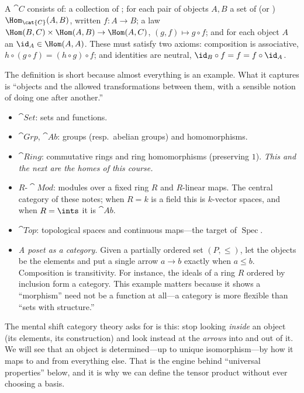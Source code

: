 \documentclass[11pt]{article}
\DeclareMathOperator{\Spec}{Spec}
\begin{document}
\begin{ddefinition}[Category]
A  $\cat{C}$ consists of: a collection of ; for each pair of
objects $A,B$ a set of  (or ) $\Hom_{\cat{C}}(A,B)$, written
$f\colon A\to B$; a  law $\Hom(B,C)\times\Hom(A,B)\to\Hom(A,C)$,
$(g,f)\mapsto g\circ f$; and for each object $A$ an  $\id_A\in\Hom(A,A)$.
These must satisfy two axioms: composition is associative, $h\circ(g\circ f)=(h\circ g)\circ
f$; and identities are neutral, $\id_B\circ f = f = f\circ\id_A$.
\end{ddefinition}

The definition is short because almost everything is an example. What it captures is
``objects and the allowed transformations between them, with a sensible notion of doing one
after another.''

\begin{eexample}
\begin{itemize}\setlength{\itemsep}{2pt}
\item $\cat{Set}$: sets and functions.
\item $\cat{Grp}$, $\cat{Ab}$: groups (resp.\ abelian groups) and homomorphisms.
\item $\cat{Ring}$: commutative rings and ring homomorphisms (preserving $1$). \emph{This and
the next are the homes of this course.}
\item $R\text{-}\cat{Mod}$: modules over a fixed ring $R$ and $R$-linear maps. The central
category of these notes; when $R=k$ is a field this is $k$-vector spaces, and when
$R=\ints$ it is $\cat{Ab}$.
\item $\cat{Top}$: topological spaces and continuous maps---the target of $\Spec$.
\item \emph{A poset as a category.} Given a partially ordered set $(P,\le)$, let the objects
be the elements and put a single arrow $a\to b$ exactly when $a\le b$. Composition is
transitivity. For instance, the ideals of a ring $R$ ordered by inclusion form a category.
This example matters because it shows a ``morphism'' need not be a function at all---a
category is more flexible than ``sets with structure.''
\end{itemize}
\end{eexample}

\begin{iintuition}
The mental shift category theory asks for is this: stop looking \emph{inside} an object (its
elements, its construction) and look instead at the \emph{arrows} into and out of it. We
will see that an object is determined---up to unique isomorphism---by how it maps to and from
everything else. That is the engine behind ``universal properties'' below, and it is why we
can define the tensor product without ever choosing a basis.
\end{iintuition}
\end{document}
